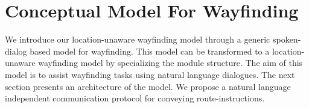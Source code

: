 \documentclass{iitkthesis}
\begin{document}
 \chapter{Conceptual Model For Wayfinding}
 \label{chap:concept}
We introduce our location-unaware wayfinding model through a generic 
spoken-dialog based model for wayfinding. This model can be transformed 
to a location-unaware wayfinding model by specializing the module 
structure. The aim of this model is to assist wayfinding tasks using 
natural language dialogues. The next section presents an architecture of 
the model. We propose a natural language independent communication 
protocol for conveying route-instructions.
\end{document}

